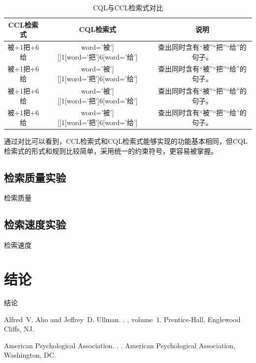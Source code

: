 \documentclass[11pt]{article}
\begin{document}
\begin{CJK*}{UTF8}{gbsn}
\begin{table}[h]
	\begin{center}
		\begin{tabular}{|c|c|c|}
			\hline \bf CCL检索式 & \bf CQL检索式 & \bf 说明 \\ \hline
			被+1把+6给 & word='被'][]{1}[word='把']{6}[word='给'] & 查出同时含有“被”“把”“给”的句子。 \\
			被+1把+6给 & word='被'][]{1}[word='把']{6}[word='给'] & 查出同时含有“被”“把”“给”的句子。 \\
			被+1把+6给 & word='被'][]{1}[word='把']{6}[word='给'] & 查出同时含有“被”“把”“给”的句子。 \\
			被+1把+6给 & word='被'][]{1}[word='把']{6}[word='给'] & 查出同时含有“被”“把”“给”的句子。 \\
			\hline
		\end{tabular}
	\end{center}
	\caption{\label{font-table} CQL与CCL检索式对比}
\end{table}

通过对比可以看到，CCL检索式和CQL检索式能够实现的功能基本相同，但CQL检索式的形式和规则比较简单，采用统一的约束符号，更容易被掌握。

\subsection{检索质量实验}

检索质量

\subsection{检索速度实验}

检索速度

\section{结论}

结论


%
%

\begin{thebibliography}{}

Alfred~V. Aho and Jeffrey~D. Ullman.
.
, volume~1.
\newblock Prentice-{Hall}, Englewood Cliffs, NJ.

{American Psychological Association}.
.
.
\newblock American Psychological Association, Washington, DC.


\end{thebibliography}
\end{CJK*}
\end{document}
